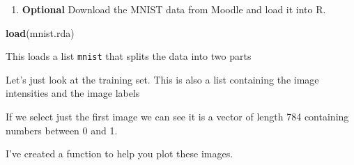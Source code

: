 \documentclass[
]{book}
\newenvironment{Shaded}{\begin{snugshade}}{\end{snugshade}}
\newcommand{\CommentTok}[1]{\textcolor[rgb]{0.56,0.35,0.01}{\textit{#1}}}
\newcommand{\DecValTok}[1]{\textcolor[rgb]{0.00,0.00,0.81}{#1}}
\newcommand{\DocumentationTok}[1]{\textcolor[rgb]{0.56,0.35,0.01}{\textbf{\textit{#1}}}}
\newcommand{\FunctionTok}[1]{\textcolor[rgb]{0.13,0.29,0.53}{\textbf{#1}}}
\newcommand{\NormalTok}[1]{#1}
\newcommand{\SpecialCharTok}[1]{\textcolor[rgb]{0.81,0.36,0.00}{\textbf{#1}}}
\newcommand{\StringTok}[1]{\textcolor[rgb]{0.31,0.60,0.02}{#1}}
\providecommand{\tightlist}{%
  \setlength{\itemsep}{0pt}\setlength{\parskip}{0pt}}
\theoremstyle{definition}
\theoremstyle{definition}
\theoremstyle{definition}
\theoremstyle{definition}
\theoremstyle{remark}
\begin{document}
\begin{enumerate}
\def\labelenumi{\arabic{enumi}.}
\setcounter{enumi}{4}
\tightlist
\item
  \textbf{Optional} Download the MNIST data from Moodle and load it into R.
\end{enumerate}

\begin{Shaded}
\begin{Highlighting}[]
\FunctionTok{load}\NormalTok{(}\StringTok{\textquotesingle{}mnist.rda\textquotesingle{}}\NormalTok{)}
\end{Highlighting}
\end{Shaded}

This loads a list \texttt{mnist} that splits the data into two parts

\begin{Shaded}
\end{Shaded}

Let's just look at the training set. This is also a list containing the image intensities and the image labels

\begin{Shaded}
\end{Shaded}

If we select just the first image we can see it is a vector of length 784 containing numbers between 0 and 1.

\begin{Shaded}
\end{Shaded}

I've created a function to help you plot these images.
\end{document}

